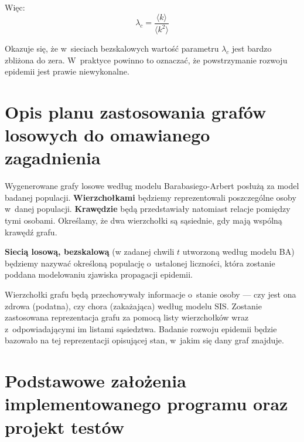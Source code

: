 Więc:
\begin{equation}
\label{eq:lambda_c}
\lambda_c = \frac{\langle k \rangle}{\langle k^2 \rangle}
\end{equation}


Okazuje się, że w~sieciach bezskalowych wartość parametru $\lambda_c$ jest bardzo zbliżona do zera. W~praktyce powinno to oznaczać, że powstrzymanie rozwoju epidemii jest prawie niewykonalne.






\section{Opis planu zastosowania grafów losowych do omawianego zagadnienia}
\label{sec:opis_planu_zastosowania_grafow_losowych}

Wygenerowane grafy losowe według modelu Barabasiego-Arbert posłużą za model badanej populacji. \textbf{Wierzchołkami} będziemy reprezentowali poszczególne osoby w~danej populacji. \textbf{Krawędzie} będą przedstawiały natomiast relacje pomiędzy tymi osobami. Określamy, że dwa wierzchołki są sąsiednie, gdy mają wspólną krawędź grafu.

\textbf{Siecią losową, bezskalową} (w zadanej chwili $t$ utworzoną według modelu BA) będziemy nazywać określoną populację o~ustalonej liczności, która zostanie poddana modelowaniu zjawiska propagacji epidemii. 

Wierzchołki grafu będą przechowywały informacje o~stanie osoby --- czy jest ona zdrowa (podatna), czy chora (zakażająca) według modelu SIS. Zostanie zastosowana reprezentacja grafu za pomocą listy wierzchołków wraz z~odpowiadającymi im listami sąsiedztwa. Badanie rozwoju epidemii będzie bazowało na tej reprezentacji opisującej stan, w~jakim się dany graf znajduje.

\section{Podstawowe założenia implementowanego programu oraz projekt testów}
\label{sec:podstawowe_zalozenia_programu}

